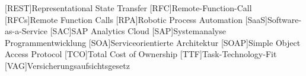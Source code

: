 \begin{acronym}[XXXXXXX]
	[REST]{Representational State Transfer}
	[RFC]{Remote-Function-Call}
	[RFCs]{Remote Function Calls}
	[RPA]{Robotic Process Automation}
	[SaaS]{Software-as-a-Service}
	[SAC]{SAP Analytics Cloud}
	[SAP]{Systemanalyse Programmentwicklung}
	[SOA]{Serviceorientierte Architektur}
	[SOAP]{Simple Object Access Protocol}
	[TCO]{Total Cost of Ownership}
	[TTF]{Task-Technology-Fit}
	[VAG]{Versicherungsaufsichtsgesetz}

\end{acronym}